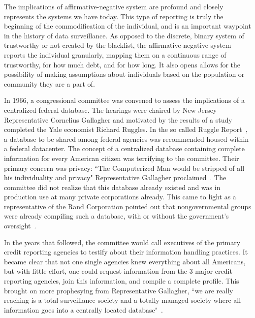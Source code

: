 The implications of affirmative-negative system are profound and closely
represents the systems we have today. This type of reporting is truly the
beginning of the commodification of the individual, and is an important
waypoint in the history of data surveillance. As opposed to the discrete,
binary system of trustworthy or not created by the blacklist, the
affirmative-negative system reports the individual granularly, mapping them on
a continuous range of trustworthy, for how much debt, and for how long. It also
opens allows for the possibility of making assumptions about individuals based
on the population or community they are a part of.

In 1966, a congressional committee was convened to assess the implications of a
centralized federal database. The hearings were chaired by New Jersey
Representative Cornelius Gallagher and motivated by the results of a study
completed the Yale economist Richard Ruggles. In the so called Ruggle
Report~\cite{ruggles1965report}, a database to be shared among federal agencies
was recommended housed within a federal datacenter. The concept of a
centralized database containing complete information for every American citizen
was terrifying to the committee. Their primary concern was privacy: ``The
Computerized Man would be stripped of all his individuality and privacy"
Representative Gallagher proclaimed~\cite{ruggles1965report}. The committee did
not realize that this database already existed and was in production use at
many private corporations already. This came to light as a representative of
the Rand Corporation pointed out that nongovernmental groups were already
compiling such a database, with or without the government's
oversight~\cite{congress1967privacy}.

In the years that followed, the committee would call executives of the primary
credit reporting agencies to testify about their information handling
practices. It became clear that not one single agencies knew everything about
all Americans, but with little effort, one could request information from the 3
major credit reporting agencies, join this information, and compile a complete
profile. This brought on more prophesying from Representative Gallagher, ``we
are really reaching is a total surveillance society and a totally managed
society where all information goes into a centrally located
database"~\cite{congress1967privacy}.

